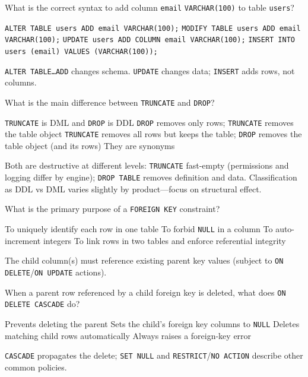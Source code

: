 \question[4]
What is the correct syntax to add column \texttt{email} \texttt{VARCHAR(100)} to table \texttt{users}?
\begin{choices}
  \CorrectChoice \lstinline[style=sqlinline]!ALTER TABLE users ADD email VARCHAR(100);!
  \choice \lstinline[style=sqlinline]!MODIFY TABLE users ADD email VARCHAR(100);!
  \choice \lstinline[style=sqlinline]!UPDATE users ADD COLUMN email VARCHAR(100);!
  \choice \lstinline[style=sqlinline]!INSERT INTO users (email) VALUES (VARCHAR(100));!
\end{choices}
\begin{solution}
  \texttt{ALTER TABLE\ldots ADD} changes schema. \texttt{UPDATE} changes data; \texttt{INSERT} adds rows, not columns.
\end{solution}

\question[4]
What is the main difference between \texttt{TRUNCATE} and \texttt{DROP}?
\begin{choices}
  \choice \texttt{TRUNCATE} is DML and \texttt{DROP} is DDL
  \choice \texttt{DROP} removes only rows; \texttt{TRUNCATE} removes the table object
  \CorrectChoice \texttt{TRUNCATE} removes all rows but keeps the table; \texttt{DROP} removes the table object (and its rows)
  \choice They are synonyms
\end{choices}
\begin{solution}
  Both are destructive at different levels: \texttt{TRUNCATE} fast-empty (permissions and logging differ by engine); \texttt{DROP TABLE} removes definition and data. Classification as DDL vs DML varies slightly by product---focus on structural effect.
\end{solution}

\question[4]
What is the primary purpose of a \texttt{FOREIGN KEY} constraint?
\begin{choices}
  \choice To uniquely identify each row in one table
  \choice To forbid \texttt{NULL} in a column
  \choice To auto-increment integers
  \CorrectChoice To link rows in two tables and enforce referential integrity
\end{choices}
\begin{solution}
  The child column(s) must reference existing parent key values (subject to \texttt{ON DELETE}/\texttt{ON UPDATE} actions).
\end{solution}

\question[4]
When a parent row referenced by a child foreign key is deleted, what does \texttt{ON DELETE CASCADE} do?
\begin{choices}
  \choice Prevents deleting the parent
  \choice Sets the child's foreign key columns to \texttt{NULL}
  \CorrectChoice Deletes matching child rows automatically
  \choice Always raises a foreign-key error
\end{choices}
\begin{solution}
  \texttt{CASCADE} propagates the delete; \texttt{SET NULL} and \texttt{RESTRICT}/\texttt{NO ACTION} describe other common policies.
\end{solution}

